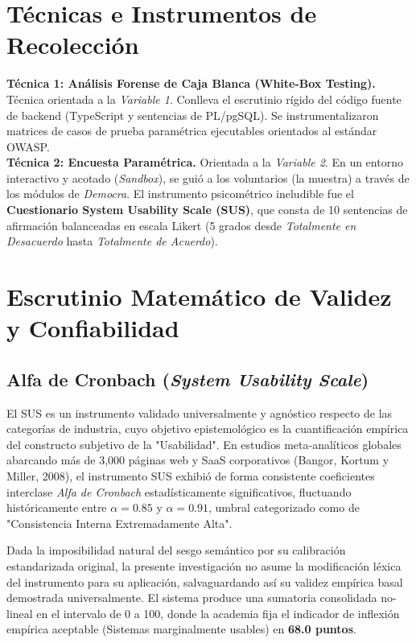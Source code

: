 \documentclass[11pt,a4paper,oneside]{report}
\begin{document}
\section{T\'ecnicas e Instrumentos de Recolecci\'on}
\textbf{T\'ecnica 1: An\'alisis Forense de Caja Blanca (White-Box Testing).} T\'ecnica orientada a la \textit{Variable 1}. Conlleva el escrutinio r\'igido del c\'odigo fuente de backend (TypeScript y sentencias de PL/pgSQL). Se instrumentalizaron matrices de casos de prueba param\'etrica ejecutables orientados al est\'andar OWASP.  \\
\textbf{T\'ecnica 2: Encuesta Param\'etrica.} Orientada a la \textit{Variable 2}. En un entorno interactivo y acotado (\textit{Sandbox}), se gui\'o a los voluntarios (la muestra) a trav\'es de los m\'odulos de \textit{Democra}. El instrumento psicom\'etrico ineludible fue el \textbf{Cuestionario System Usability Scale (SUS)}, que consta de 10 sentencias de afirmaci\'on balanceadas en escala Likert (5 grados desde \textit{Totalmente en Desacuerdo} hasta \textit{Totalmente de Acuerdo}). 

\section{Escrutinio Matem\'atico de Validez y Confiabilidad}
\subsection{Alfa de Cronbach (\textit{System Usability Scale})}
El SUS es un instrumento validado universalmente y agn\'ostico respecto de las categor\'ias de industria, cuyo objetivo epistemol\'ogico es la cuantificaci\'on emp\'irica del constructo subjetivo de la "Usabilidad". En estudios meta-anal\'iticos globales abarcando m\'as de 3,000 p\'aginas web y SaaS corporativos (Bangor, Kortum y Miller, 2008), el instrumento SUS exhibi\'o de forma consistente coeficientes interclase \textit{Alfa de Cronbach} estad\'isticamente significativos, fluctuando hist\'oricamente entre $\alpha = 0.85$ y $\alpha = 0.91$, umbral categorizado como de "Consistencia Interna Extremadamente Alta". 

Dada la imposibilidad natural del sesgo sem\'antico por su calibraci\'on estandarizada original, la presente investigaci\'on no asume la modificaci\'on l\'exica del instrumento para su aplicaci\'on, salvaguardando as\'i su validez emp\'irica basal demostrada universalmente. El sistema produce una sumatoria consolidada no-lineal en el intervalo de 0 a 100, donde la academia fija el indicador de inflexi\'on emp\'irica aceptable (Sistemas marginalmente usables) en \textbf{68.0 puntos}.
\end{document}

